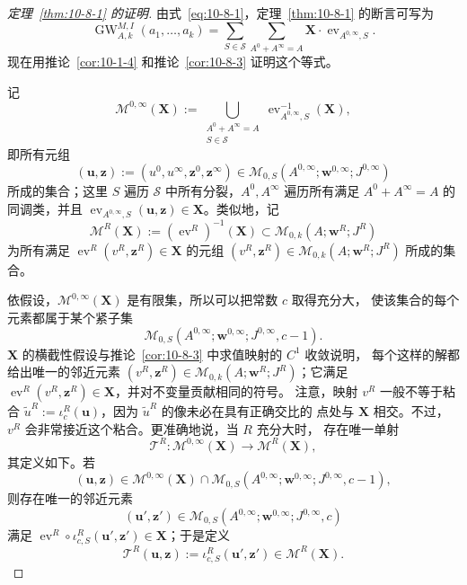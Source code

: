 \begin{proof}[定理~\ref{thm:10-8-1} 的证明]
由式~\eqref{eq:10-8-1}，定理~\ref{thm:10-8-1} 的断言可写为
\begin{equation}\label{eq:10-8-3}
  \operatorname{GW}_{A,k}^{M,I}(a_1,\ldots,a_k)
  =\sum_{S\in\mathcal S}\sum_{A^0+A^\infty=A}
  \mathbf X\mathbin{\cdot}\operatorname{ev}_{A^{0,\infty},S}.
\end{equation}
现在用推论~\ref{cor:10-1-4} 和推论~\ref{cor:10-8-3} 证明这个等式。

记
\[
  \mathcal M^{0,\infty}(\mathbf X):=
  \bigcup_{\substack{A^0+A^\infty=A\\S\in\mathcal S}}
  \operatorname{ev}_{A^{0,\infty},S}^{-1}(\mathbf X),
\]
即所有元组
\[
  (\mathbf u,\mathbf z):=(u^0,u^\infty,\mathbf z^0,\mathbf z^\infty)
  \in\mathcal M_{0,S}(A^{0,\infty};\mathbf w^{0,\infty};J^{0,\infty})
\]
所成的集合；这里 $S$ 遍历 $\mathcal S$ 中所有分裂，$A^0,A^\infty$ 遍历所有满足
$A^0+A^\infty=A$ 的同调类，并且
$\operatorname{ev}_{A^{0,\infty},S}(\mathbf u,\mathbf z)\in\mathbf X$。类似地，记
\[
  \mathcal M^R(\mathbf X):=(\operatorname{ev}^R)^{-1}(\mathbf X)
  \subset\mathcal M_{0,k}(A;\mathbf w^R;J^R)
\]
为所有满足
$\operatorname{ev}^R(v^R,\mathbf z^R)\in\mathbf X$ 的元组
$(v^R,\mathbf z^R)\in\mathcal M_{0,k}(A;\mathbf w^R;J^R)$ 所成的集合。

依假设，$\mathcal M^{0,\infty}(\mathbf X)$ 是有限集，所以可以把常数 $c$ 取得充分大，
使该集合的每个元素都属于某个紧子集
\[
  \mathcal M_{0,S}(A^{0,\infty};\mathbf w^{0,\infty};J^{0,\infty},c-1).
\]
$\mathbf X$ 的横截性假设与推论~\ref{cor:10-8-3} 中求值映射的 $C^1$ 收敛说明，
每个这样的解都给出唯一的邻近元素
$(v^R,\mathbf z^R)\in\mathcal M_{0,k}(A;\mathbf w^R;J^R)$；它满足
$\operatorname{ev}^R(v^R,\mathbf z^R)\in\mathbf X$，并对不变量贡献相同的符号。
注意，映射 $v^R$ 一般不等于粘合
$\widetilde u^R:=\iota_c^R(\mathbf u)$，因为 $\widetilde u^R$ 的像未必在具有正确交比的
点处与 $\mathbf X$ 相交。不过，$v^R$ 会非常接近这个粘合。更准确地说，当 $R$ 充分大时，
存在唯一单射
\begin{equation}\label{eq:10-8-4}
  \mathcal T^R:\mathcal M^{0,\infty}(\mathbf X)
  \longrightarrow\mathcal M^R(\mathbf X),
\end{equation}
其定义如下。若
\[
  (\mathbf u,\mathbf z)\in\mathcal M^{0,\infty}(\mathbf X)
  \cap\mathcal M_{0,S}(A^{0,\infty};\mathbf w^{0,\infty};J^{0,\infty},c-1),
\]
则存在唯一的邻近元素
\[
  (\mathbf u',\mathbf z')
  \in\mathcal M_{0,S}(A^{0,\infty};\mathbf w^{0,\infty};J^{0,\infty},c)
\]
满足 $\operatorname{ev}^R\circ\iota_{c,S}^R(\mathbf u',\mathbf z')
\in\mathbf X$；于是定义
\[
  \mathcal T^R(\mathbf u,\mathbf z):=
  \iota_{c,S}^R(\mathbf u',\mathbf z')\in\mathcal M^R(\mathbf X).
\]


\end{proof}
